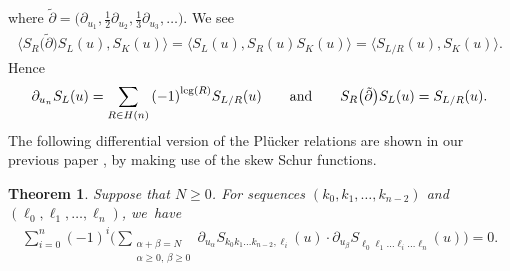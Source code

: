 \documentclass[10pt,a4paper]{amsart}
\numberwithin{equation}{section}
\newtheorem{Theorem}{Theorem}[section]
\begin{document}
where $\tilde{\partial}=\bigl(\partial_{u_1},\frac{1}{2}\partial_{u_2},\frac{1}{3}\partial_{u_3},\dots\bigr)$. We see
\begin{align*}
\bigl\langle S_{R}\bigl(\tilde{\partial}\bigr)S_{L}(u), S_{K}(u)\bigr\rangle =\langle S_{L}(u),S_{R}(u)S_{K}(u)\rangle
=\langle S_{L/R}(u), S_{K}(u)\rangle.
\end{align*}
Hence
\begin{gather*}
\partial_{u_n}S_{L}(u)=\sum_{R\in H(n)}{(-1)}^{{\rm leg}(R)}S_{L/R}(u)\qquad \mbox{and}\qquad S_{R}\bigl(\tilde{\partial}\bigr)S_{L}(u)=S_{L/R}(u).
\end{gather*}
The following differential version of the Pl\"ucker relations are shown in our previous paper \cite{asy3}, by making use of the skew Schur functions.

\begin{Theorem}
Suppose that $N\geq0$. For sequences $(k_{0},k_1,\dots,k_{n-2})$ and $(\ell_0,\ell_1,\dots, \ell_{n})$, we~have
\begin{gather*}
\sum_{i= 0}^{n}{(-1)}^{i}\Biggl(\sum_{\substack{\alpha+\beta=N\\ \alpha\geq 0,\,\beta \geq 0}}\partial_{u_\alpha}S_{k_0 k_1 \dots k_{n-2},\ell_i}(u)\cdot \partial_{u_\beta}S_{\ell_0 \ell_1 \dots \widehat{\ell_i} \dots \ell_{n}}(u) \Biggr)=0.
\end{gather*}
\end{Theorem}
\end{document}
